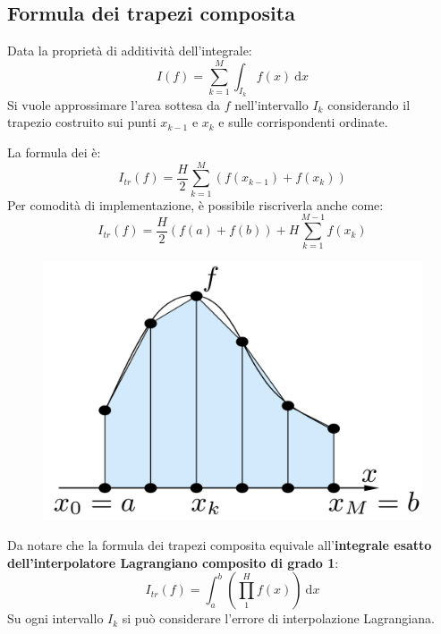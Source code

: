 \subsection{Formula dei trapezi composita}\label{subsection: formula dei trapezi composita}

Data la proprietà di additività dell'integrale:
\begin{equation*}
	I\left(f\right) = \displaystyle\sum_{k=1}^{M} \int_{I_{k}} f\left(x\right) \:\mathrm{d}x
\end{equation*}
Si vuole approssimare l'area sottesa da $f$ nell'intervallo $I_{k}$ considerando il trapezio costruito sui punti $x_{k-1}$ e $x_{k}$ e sulle corrispondenti ordinate.

\highspace
La formula dei  è:
\begin{equation}
	I_{tr}\left(f\right) = \dfrac{H}{2} \displaystyle\sum_{k=1}^{M} \left(f\left(x_{k-1}\right) + f\left(x_{k}\right)\right)
\end{equation}
Per comodità di implementazione, è possibile riscriverla anche come:
\begin{equation*}
	I_{tr}\left(f\right) = \dfrac{H}{2} \left(f\left(a\right) + f\left(b\right)\right) + H \sum_{k=1}^{M-1} f\left(x_{k}\right)
\end{equation*}
\begin{figure}[!htp]
	\centering
	\includegraphics[width=.4\textwidth]{img/formule-di-quadratura-3.png}
\end{figure}

\noindent
Da notare che la formula dei trapezi composita equivale all'\textbf{integrale esatto dell'interpolatore Lagrangiano composito di grado 1}:
\begin{equation}
	I_{tr}\left(f\right) = \displaystyle \int_{a}^{b} \left(\displaystyle\prod_{1}^{H} f\left(x\right)\right) \:\mathrm{d}x
\end{equation}
Su ogni intervallo $I_{k}$ si può considerare l'errore di interpolazione Lagrangiana. 

